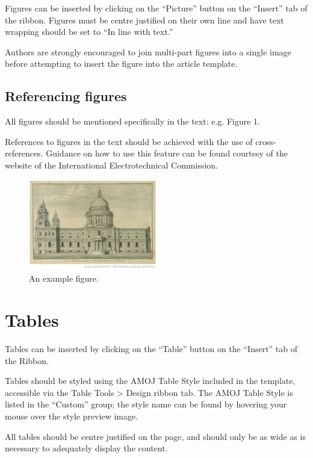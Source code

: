 \documentclass[10pt]{article}
\begin{document}
Figures can be inserted by clicking on the ``Picture'' button on the ``Insert'' tab of the ribbon. Figures must be centre justified on their own line and have text wrapping should be set to ``In line with text.''

Authors are strongly encouraged to join multi-part figures into a single image before attempting to insert the figure into the article template. 

\subsection{Referencing figures}
\label{referencing_figures}
All figures should be mentioned specifically in the text: e.g. Figure 1.

References to figures in the text should be achieved with the use of cross-references. Guidance on how to use this feature can be found courtesy of the website of the International Electrotechnical Commission.

\begin{figure}
  \centering
    \caption{An example figure.}
    \label{figure:exampleFigure}
    \includegraphics[keepaspectratio=true,width=0.5\textwidth]{example_figure.png}
\end{figure}

\section{Tables}
\label{tables}
Tables can be inserted by clicking on the “Table” button on the “Insert” tab of the Ribbon.

Tables should be styled using the AMOJ Table Style included in the template, accessible via the Table Tools > Design ribbon tab. The AMOJ Table Style is listed in the “Custom” group; the style name can be found by hovering your mouse over the style preview image. 

All tables should be centre justified on the page, and should only be as wide as is necessary to adequately display the content.
\end{document}
